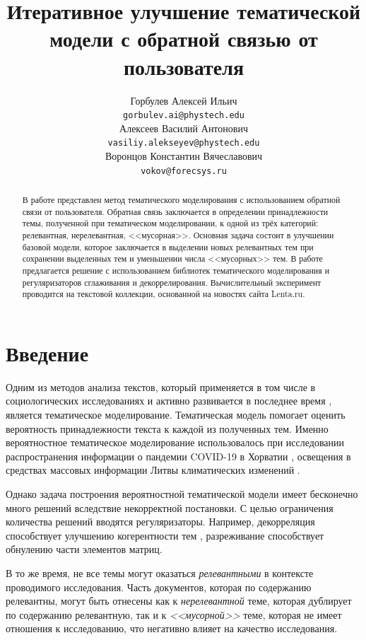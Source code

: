 \documentclass{article}
\title{Итеративное улучшение тематической модели с обратной связью от пользователя}
\author{ Горбулев Алексей Ильич \\
	\texttt{gorbulev.ai@phystech.edu} \\
	\And
	Алексеев Василий Антонович \\
	\texttt{vasiliy.alekseyev@phystech.edu} \\
	\And
    Воронцов Константин Вячеславович \\
    \texttt{vokov@forecsys.ru} \\
}
\date{}
\begin{document}
\maketitle

\begin{abstract}
	В работе представлен метод тематического моделирования с использованием обратной связи от пользователя. Обратная связь заключается в определении принадлежности темы, полученной при тематическом моделировании, к одной из трёх категорий: релевантная, нерелевантная, <<мусорная>>. Основная задача состоит в улучшении базовой модели, которое заключается в выделении новых релевантных тем при сохранении выделенных тем и уменьшении числа <<мусорных>> тем. В работе предлагается решение с использованием библиотек тематического моделирования и регуляризаторов сглаживания и декоррелирования. Вычислительный эксперимент проводится на текстовой коллекции, основанной на новостях сайта Lenta.ru.
\end{abstract}


\section{Введение}
Одним из методов анализа текстов, который применяется в том числе в социологических исследованиях \citep{DIMAGGIO2013570} и активно развивается в последнее время \citep{10031921}, является тематическое моделирование.
Тематическая модель помогает оценить вероятность принадлежности текста к каждой из полученных тем.
Именно вероятностное тематическое моделирование использовалось при исследовании распространения информации о пандемии COVID-19 в Хорватии \citep{pandemic2021}, освещения в средствах массовых информации Литвы климатических изменений \citep{climate2021}.

Однако задача построения вероятностной тематической модели имеет бесконечно много решений \citep{bigartm} вследствие некорректной постановки.
С целью ограничения количества решений вводятся регуляризаторы. 
Например, декорреляция способствует улучшению когерентности тем \citep{artm2}, разреживание способствует обнулению части элементов матриц.

В то же время, не все темы могут оказаться \textit{релевантными} в контексте проводимого исследования.
Часть документов, которая по содержанию релевантны, могут быть отнесены как к \textit{нерелевантной} теме, которая дублирует по содержанию релевантную, так и к \textit{<<мусорной>>} теме, которая не имеет отношения к исследованию, что негативно влияет на качество исследования.
\end{document}
